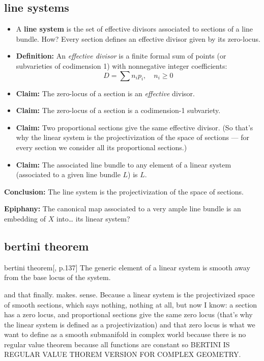 \subsection{line systems}
\begin{itemize}
  \item A \textbf{line system} is the set of effective divisors associated to sections of a line bundle. How? Every section defines an effective divisor given by its zero-locus.
  
  \item \textbf{Definition:} An \emph{effective divisor} is a finite formal sum of points (or subvarieties of codimension 1) with nonnegative integer coefficients:
  \[
  D = \sum n_i p_i, \quad n_i \geq 0
  \]
  
  \item \textbf{Claim:} The zero-locus of a section is an \emph{effective} divisor.
\item \textbf{Claim:} The zero-locus of a section is a codimension-1 subvariety. 

  \item \textbf{Claim:} Two proportional sections give the same effective divisor. (So that's why the linear system is the projectivization of the space of sections — for every section we consider all its proportional sections.)
\item \textbf{Claim:} The associated line bundle to any element of a linear system (associated to a given line bundle \(L\)) is \(L\). 
\end{itemize}

\textbf{Conclusion:} The line system is the projectivization of the space of sections.

\textbf{Epiphany:} The canonical map associated to a very ample line bundle is an embedding of \( X \) into… its linear system?
\subsection{bertini theorem}

\begin{thing6}{bertini theorem}[\cite{gri}, p.137]\leavevmode
The generic element of a linear system is smooth away from the base locus of the system.
\end{thing6}

and that finally. makes. sense. Because a linear system is the projectivized space of smooth sections, which says nothing, nothing at all, but now I know: a section has a zero locus, and proportional sections give the same zero locus (that's why the linear system is defined as a projectivization) and that zero locus is what we want to define as a smooth submanifold in complex world because there is no regular value theorem because all functions are constant so BERTINI IS REGULAR VALUE THOREM VERSION FOR COMPLEX GEOMETRY.

